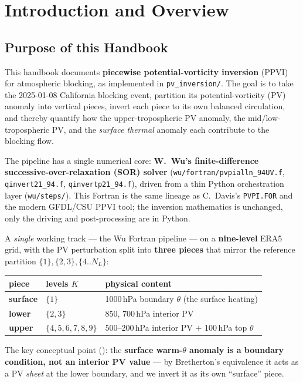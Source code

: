 \chapter{Introduction and Overview}
\label{chap:intro}

\section{Purpose of this Handbook}

This handbook documents \textbf{piecewise potential-vorticity inversion}
(PPVI) for atmospheric blocking, as implemented in
\texttt{pv\_inversion/}.  The goal is to take the 2025-01-08 California
blocking event, partition its potential-vorticity (PV) anomaly into
vertical pieces, invert each piece to its own balanced circulation, and
thereby quantify how the upper-tropospheric PV anomaly, the
mid/low-tropospheric PV, and the \emph{surface thermal} anomaly each
contribute to the blocking flow.

The pipeline has a single numerical core: \textbf{W.~Wu's
finite-difference successive-over-relaxation (SOR) solver}
(\texttt{wu/fortran/pvpialln\_94UV.f}, \texttt{qinvert21\_94.f},
\texttt{qinvertp21\_94.f}), driven from a thin Python orchestration
layer (\texttt{wu/steps/}).  This Fortran is the same lineage as
C.~Davis's \texttt{PVPI.FOR} \cite{Davis1992} and the modern GFDL/CSU
PPVI tool; the inversion mathematics is unchanged, only the driving and
post-processing are in Python.

\begin{keybox}
A \emph{single} working track --- the Wu Fortran pipeline --- on a
\textbf{nine-level} ERA5 grid, with the PV perturbation split into
\textbf{three pieces} that mirror the reference partition
$\{1\},\{2,3\},\{4..N_L\}$:
\begin{center}\small
\begin{tabular}{lll}
\toprule
piece & levels $K$ & physical content \\
\midrule
\textbf{surface} & $\{1\}$              & 1000\,hPa boundary $\theta$ (the surface heating) \\
\textbf{lower}   & $\{2,3\}$            & 850, 700\,hPa interior PV \\
\textbf{upper}   & $\{4,5,6,7,8,9\}$    & 500--200\,hPa interior PV $+$ 100\,hPa top $\theta$ \\
\bottomrule
\end{tabular}
\end{center}
The key conceptual point (): the
\textbf{surface warm-$\theta$ anomaly is a boundary condition, not an
interior PV value} --- by Bretherton's equivalence it acts as a
PV \emph{sheet} at the lower boundary, and we invert it as its own
``surface'' piece.
\end{keybox}

